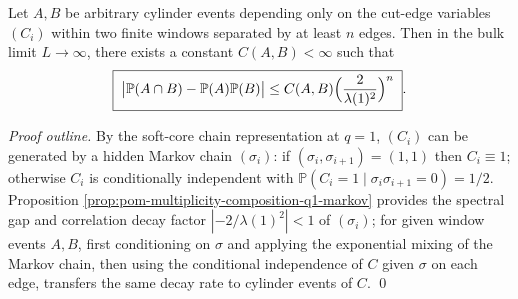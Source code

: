 \begin{theorem}\label{thm:pom-multiplicity-composition-exponential-mixing}
Let \(A,B\) be arbitrary cylinder events depending only on the cut-edge variables \((C_i)\) within two finite windows separated by at least \(n\) edges.
Then in the bulk limit \(L\to\infty\), there exists a constant \(C(A,B)<\infty\) such that
\[
\boxed{\;
\bigl|\mathbb{P}(A\cap B)-\mathbb{P}(A)\mathbb{P}(B)\bigr|
\le C(A,B)\Bigl(\frac{2}{\lambda(1)^2}\Bigr)^{n}\; } .
\]
\end{theorem}
\begin{proof}[Proof outline]
By the soft-core chain representation at \(q=1\), \((C_i)\) can be generated by a hidden Markov chain \((\sigma_i)\): if \((\sigma_i,\sigma_{i+1})=(1,1)\) then \(C_i\equiv 1\); otherwise \(C_i\) is conditionally independent with \(\mathbb{P}(C_i=1\mid \sigma_i\sigma_{i+1}=0)=1/2\).
Proposition \ref{prop:pom-multiplicity-composition-q1-markov} provides the spectral gap and correlation decay factor \(|-2/\lambda(1)^2|<1\) of \((\sigma_i)\);
for given window events \(A,B\), first conditioning on \(\sigma\) and applying the exponential mixing of the Markov chain, then using the conditional independence of \(C\) given \(\sigma\) on each edge, transfers the same decay rate to cylinder events of \(C\). \qed
\end{proof}

